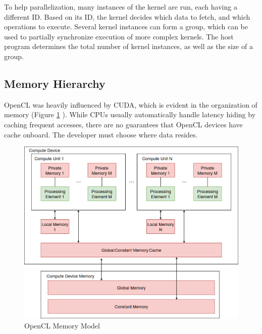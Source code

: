 \noindent To help parallelization, many instances of the kernel are run, each having a different ID. Based on its ID, the kernel decides which data to fetch, and which operations to execute. Several kernel instances can form a group, which can be used to partially synchronize execution of more complex kernels. The host program determines the total number of kernel instances, as well as the size of a group.

\subsection{Memory Hierarchy}
OpenCL was heavily influenced by CUDA, which is evident in the organization of memory (Figure \ref{fig:openclmemory} \cite{munshi2009opencl}). While CPUs usually automatically handle latency hiding by caching frequent accesses, there are no guarantees that OpenCL devices have cache onboard. The developer must choose where data resides.

\begin{figure}[h]
    \includegraphics[width=\linewidth]{Figures/openclmem.png}
    \caption{OpenCL Memory Model}
    \label{fig:openclmemory}
\end{figure}

